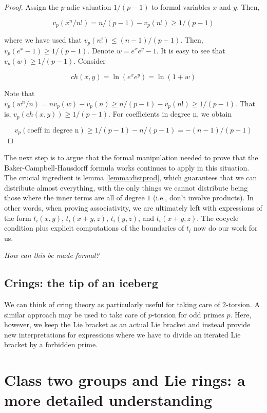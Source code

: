 \documentclass[10pt]{amsart}
\begin{document}
\begin{proof}
  Assign the $p$-adic valuation $1/(p-1)$ to formal variables $x$ and
  $y$. Then,

  $$v_p(x^n/n!)=n/(p-1) - v_p(n!) \geq 1/(p-1)$$

  where we have used that $v_p(n!) \leq (n-1)/(p-1)$. Then,
  $v_p(e^x-1)\geq 1/(p-1)$. Denote $w=e^xe^y-1$. It is easy to see
  that $v_p(w) \geq 1/(p-1)$. Consider

  $$ch(x,y)=\ln(e^xe^y)=\ln(1+w)$$

  Note that $v_p(w^n/n)=nv_p(w)-v_p(n)\geq n/(p-1) - v_p(n!) \geq
  1/(p-1)$. That is, $v_p(ch(x,y))\geq 1/(p-1)$. For coefficients in
  degree n, we obtain

  $$v_p(\text{coeff in degree n}) \geq 1/(p-1) - n/(p-1)=-(n-1)/(p-1)$$

\end{proof}

The next step is to argue that the formal manipulation needed to prove
that the Baker-Campbell-Hausdorff formula works continues to apply in
this situation. The crucial ingredient is lemma \ref{lemma:distprod},
which guarantees that we can distribute almost everything, with the
only things we cannot distribute being those where the inner terms are
all of degree $1$ (i.e., don't involve products). In other words, when
proving associativity, we are ultimately left with expressions of the
form $t_i(x,y)$, $t_i(x + y,z)$, $t_i(y,z)$, and $t_i(x + y,z)$. The
cocycle condition plus explicit computations of the boundaries of
$t_i$ now do our work for us.

{\em How can this be made formal?}

\subsection*{Crings: the tip of an iceberg}

We can think of cring theory as particularly useful for taking care
of $2$-torsion. A similar approach may be used to take care of
$p$-torsion for odd primes $p$. Here, however, we keep the Lie bracket
as an actual Lie bracket and instead provide new interpretations for
expressions where we have to divide an iterated Lie bracket by a
forbidden prime.

\section{Class two groups and Lie rings: a more detailed understanding}
\end{document}
